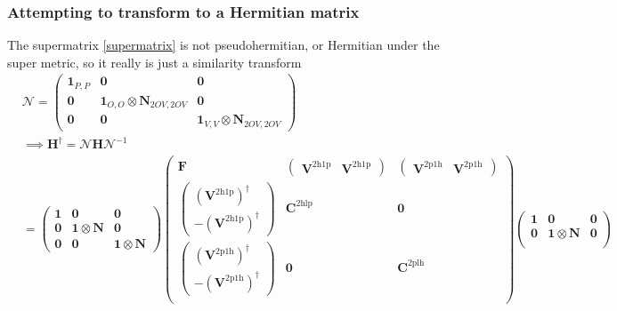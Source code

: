 \subsubsection{Attempting to transform to a Hermitian matrix}
\label{subsub:attempting_to_transform_to_a_hermitian_matrix}
The supermatrix \ref{supermatrix} is not pseudohermitian, or Hermitian under the super metric, so it really is just a similarity transform
\begin{align}
&\bm{\mathcal{N}} = \begin{pmatrix}
\bm{1}_{P,P} & \bm{0} & \bm{0} \\
\bm{0} & \bm{1}_{O,O} \otimes \bm{N}_{2OV,2OV} & \bm{0} \\
\bm{0} & \bm{0} & \bm{1}_{V,V} \otimes \bm{N}_{2OV,2OV}
\end{pmatrix}\\
&\implies \bm{H}^\dagger = \bm{\mathcal{N}} \bm{H} \bm{\mathcal{N}}^{-1}\\
& = \begin{pmatrix}
\bm{1} & \bm{0} & \bm{0} \\
\bm{0} & \bm{1} \otimes \bm{N} & \bm{0} \\
\bm{0} & \bm{0} & \bm{1} \otimes \bm{N}
\end{pmatrix}
\begin{pmatrix}
\bm{F} & \begin{pmatrix} \bm{V}^{2\mathrm{h1p}} & \bm{V}^{2\mathrm{h1p}} \end{pmatrix} & \begin{pmatrix} \bm{V}^{2\mathrm{p1h}} & \bm{V}^{2\mathrm{p1h}} \end{pmatrix} \\
\begin{pmatrix} \left(\bm{V}^{2\mathrm{h1p}}\right)^{\dagger} \\ -\left(\bm{V}^{2\mathrm{h1p}}\right)^{\dagger} \end{pmatrix} & \bm{C}^{2\mathrm{hlp}} & \bm{0} \\
\begin{pmatrix} \left(\bm{V}^{2\mathrm{p1h}}\right)^{\dagger} \\ -\left(\bm{V}^{2\mathrm{p1h}}\right)^{\dagger} \end{pmatrix} & \bm{0} & \bm{C}^{2\mathrm{plh}} \\
\end{pmatrix}
\begin{pmatrix}
\bm{1} & \bm{0} & \bm{0} \\
\bm{0} & \bm{1} \otimes \bm{N} & \bm{0} \\

\end{pmatrix}
\end{align}
